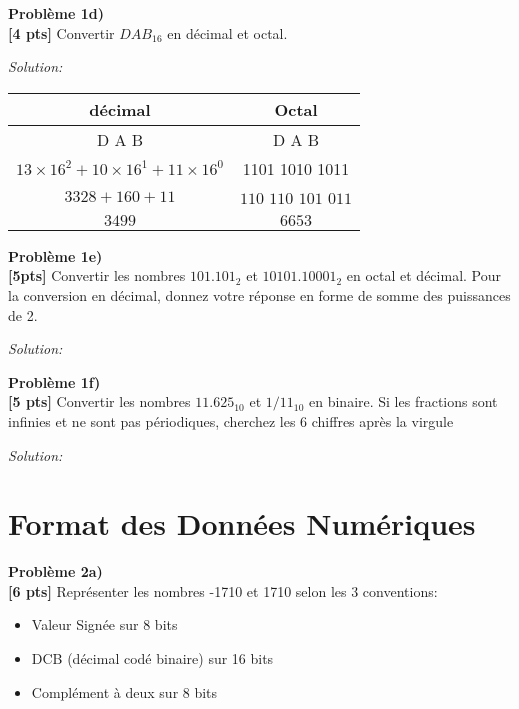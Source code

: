 \documentclass{article}
\newenvironment{problem}[2][Problème]
    { \begin{mdframed}[backgroundcolor=gray!20] \textbf{#1 #2} \\}
    {  \end{mdframed}}
\newenvironment{solution}
    {\textit{Solution:}}
    {}
\begin{document}
\begin{problem}{1d)}
\textbf{[4 pts]} Convertir $DAB_{16}$ en décimal et octal.
\end{problem}
\begin{solution}
    \begin{tabular}{c|c}
        décimal & Octal\\
        \hline
        D \hspace{40pt}A\hspace{40pt} B & D\hspace{15pt} A\hspace{15pt} B\\
        $13\times16^2 + 10\times16^1 + 11\times16^0$ & 1101 1010 1011\\
        $3328+160+11$ & $110$ $110$ $101$ $011$\\
        $3499$ & $6653$
        
    \end{tabular}
\end{solution}

\begin{problem}{1e)}
\textbf{[5pts]} Convertir les nombres $101.101_2$ et $10101.10001_2$ en octal et décimal. Pour la conversion en décimal, donnez votre réponse en forme de somme des puissances de 2.
\end{problem}
\begin{solution}
\end{solution}

\begin{problem}{1f)}
\textbf{[5 pts]} Convertir les nombres $11.625_{10}$ et $1/11_{10}$ en binaire. Si les fractions sont infinies et ne sont pas périodiques, cherchez les 6 chiffres après la virgule
\end{problem}
\begin{solution}
\end{solution}

\section{Format des Données Numériques}

\begin{problem}{2a)}
\textbf{[6 pts]} Représenter les nombres -1710 et 1710 selon les 3 conventions:
    \begin{itemize}
        \item Valeur Signée sur 8 bits
        \item DCB (décimal codé binaire) sur 16 bits
        \item Complément à deux sur 8 bits
    \end{itemize}
\end{problem}
\end{document}
